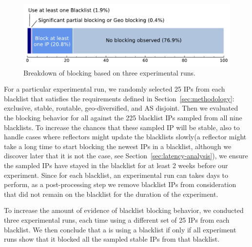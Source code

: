 \begin{figure}[t]
\centering
\includegraphics[width=0.95\columnwidth]{data_usage/images/reflector_breakdown_v2.pdf}
\caption{Breakdown of {} blocking based on three
  experimental runs.}
\label{fig:reflector-breakdown}
\end{figure}

For a particular experimental run, we randomly selected 25 IPs from
each blacklist that satisfies the requirements defined in
Section~\ref{sec:methodology}: exclusive, stable, routable,
geo-diversified, and AS disjoint. Then we evaluated the blocking
behavior for all {} {} against the 225
blacklist IPs sampled from all nine blacklists. To increase the chances
that these sampled IP will be stable, also to handle cases where reflectors
might update the blacklists slowly(a reflector might take a long time to
start blocking the newest IPs in a blacklist, although we discover
later that it is not the case, see Section~\ref{sec:latency-analysis}),
we ensure the sampled IPs have stayed in the blacklist for at least
2 weeks before our experiment. Since for each blacklist,
an experimental run can takes days to perform, as a post-processing step
we remove blacklist IPs from consideration that did not remain on the
blacklist for the duration of the experiment.



To increase the amount of evidence of blacklist blocking behavior, we
conducted three experimental runs, each time using a different set of 25
IPs from each blacklist.
We then conclude that a {} is using a blacklist if only if
all experiment runs show that it blocked all the sampled stable IPs
from that blacklist.

